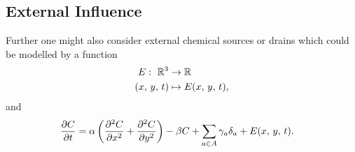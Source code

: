 \documentclass{class}
\begin{document}
\subsection{External Influence}

Further one might also consider external chemical sources or drains which could be modelled by a function
\begin{align*}
    E:\ 
    \R^3&\to\R\\
    (x,\,y,\,t)&\mapsto E(x,\,y,\,t),
\end{align*}
and
\begin{align*}
    \pdv{C}{t}
    &=\alpha\left(\pdv[2]{C}{x}+\pdv[2]{C}{y}\right)-\beta C+\sum_{a\in A}\gamma_a\delta_a+E(x,\,y,\,t).
\end{align*}

\appendix

\printbibliography


\end{document}
